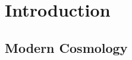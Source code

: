 
\chapter{Introduction} %

\label{Introduction} %


\newcommand{\keyword}[1]{\textbf{#1}}
\newcommand{\tabhead}[1]{\textbf{#1}}
\newcommand{\code}[1]{\texttt{#1}}
\newcommand{\file}[1]{\texttt{\bfseries#1}}
\newcommand{\option}[1]{\texttt{\itshape#1}}


\section{Modern Cosmology}

